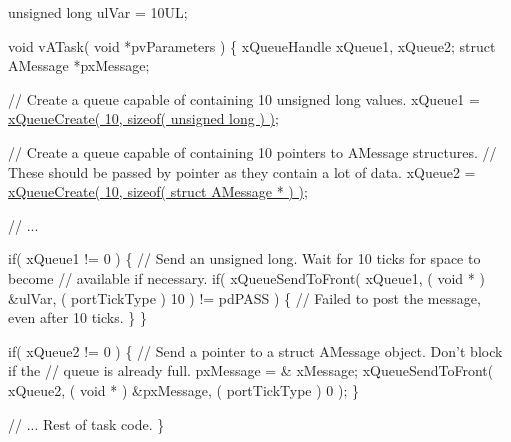 \begin{DoxyPre}unsigned long ulVar = 10UL;\end{DoxyPre}



\begin{DoxyPre}void vATask( void *pvParameters )
\{
xQueueHandle xQueue1, xQueue2;
struct AMessage *pxMessage;\end{DoxyPre}



\begin{DoxyPre}   // Create a queue capable of containing 10 unsigned long values.
   xQueue1 = \hyperlink{queue_8h_aeb858b824bd74a934ea7ebb81af2a6bb}{xQueueCreate( 10, sizeof( unsigned long ) )};\end{DoxyPre}



\begin{DoxyPre}   // Create a queue capable of containing 10 pointers to AMessage structures.
   // These should be passed by pointer as they contain a lot of data.
   xQueue2 = \hyperlink{queue_8h_aeb858b824bd74a934ea7ebb81af2a6bb}{xQueueCreate( 10, sizeof( struct AMessage * ) )};\end{DoxyPre}



\begin{DoxyPre}   // ...\end{DoxyPre}



\begin{DoxyPre}   if( xQueue1 != 0 )
   \{
    // Send an unsigned long.  Wait for 10 ticks for space to become
    // available if necessary.
    if( xQueueSendToFront( xQueue1, ( void * ) \&ulVar, ( portTickType ) 10 ) != pdPASS )
    \{
        // Failed to post the message, even after 10 ticks.
    \}
   \}\end{DoxyPre}



\begin{DoxyPre}   if( xQueue2 != 0 )
   \{
    // Send a pointer to a struct AMessage object.  Don't block if the
    // queue is already full.
    pxMessage = \& xMessage;
    xQueueSendToFront( xQueue2, ( void * ) \&pxMessage, ( portTickType ) 0 );
   \}\end{DoxyPre}



\begin{DoxyPre}   // ... Rest of task code.
\}
\end{DoxyPre}


